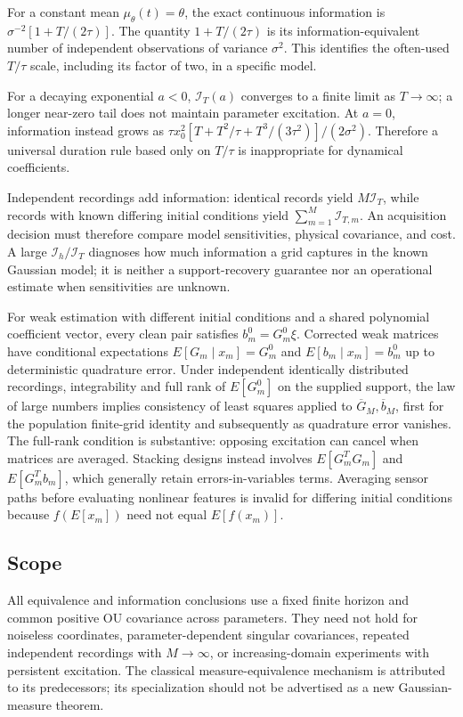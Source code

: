 \documentclass[
  11pt,
]{article}
\begin{document}
For a constant mean \(\mu_\theta(t)=\theta\), the exact continuous
information is \(\sigma^{-2}[1+T/(2\tau)]\). The quantity
\(1+T/(2\tau)\) is its information-equivalent number of independent
observations of variance \(\sigma^2\). This identifies the often-used
\(T/\tau\) scale, including its factor of two, in a specific model.

For a decaying exponential \(a<0\), \(\mathcal I_T(a)\) converges to a
finite limit as \(T\to\infty\); a longer near-zero tail does not
maintain parameter excitation. At \(a=0\), information instead grows as
\(\tau x_0^2[ T+T^2/\tau+T^3/(3\tau^2)]/(2\sigma^2)\). Therefore a
universal duration rule based only on \(T/\tau\) is inappropriate for
dynamical coefficients.

Independent recordings add information: identical records yield
\(M\mathcal I_T\), while records with known differing initial conditions
yield \(\sum_{m=1}^M\mathcal I_{T,m}\). An acquisition decision must
therefore compare model sensitivities, physical covariance, and cost. A
large \(\mathcal I_h/\mathcal I_T\) diagnoses how much information a
grid captures in the known Gaussian model; it is neither a
support-recovery guarantee nor an operational estimate when
sensitivities are unknown.

For weak estimation with different initial conditions and a shared
polynomial coefficient vector, every clean pair satisfies
\(b_m^0=G_m^0\xi\). Corrected weak matrices have conditional
expectations \(E[G_m\mid x_m]=G_m^0\) and \(E[b_m\mid x_m]=b_m^0\) up to
deterministic quadrature error. Under independent identically
distributed recordings, integrability and full rank of \(E[G_m^0]\) on
the supplied support, the law of large numbers implies consistency of
least squares applied to \(\overline G_M,\overline b_M\), first for the
population finite-grid identity and subsequently as quadrature error
vanishes. The full-rank condition is substantive: opposing excitation
can cancel when matrices are averaged. Stacking designs instead involves
\(E[G_m^TG_m]\) and \(E[G_m^Tb_m]\), which generally retain
errors-in-variables terms. Averaging sensor paths before evaluating
nonlinear features is invalid for differing initial conditions because
\(f(E[x_m])\) need not equal \(E[f(x_m)]\).

\subsection{Scope}\label{scope}

All equivalence and information conclusions use a fixed finite horizon
and common positive OU covariance across parameters. They need not hold
for noiseless coordinates, parameter-dependent singular covariances,
repeated independent recordings with \(M\to\infty\), or
increasing-domain experiments with persistent excitation. The classical
measure-equivalence mechanism is attributed to its predecessors; its
specialization should not be advertised as a new Gaussian-measure
theorem.
\end{document}
